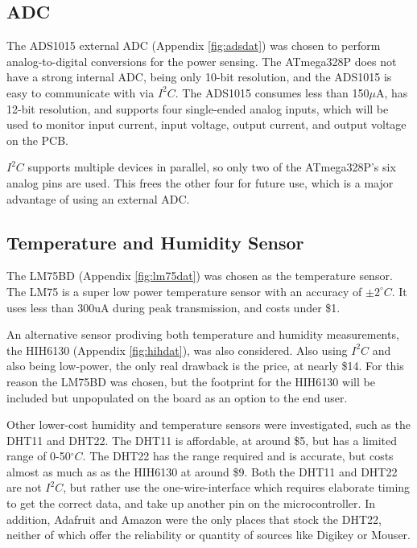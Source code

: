 \documentclass{article}
\numberwithin{figure}{section}
\numberwithin{equation}{section}
\begin{document}
{\subsection{ADC} \label{sect:adc_just}
The ADS1015 external ADC (Appendix \ref{fig:adsdat}) was chosen to perform analog-to-digital conversions for the power sensing. The ATmega328P does not have a strong internal ADC, being only 10-bit resolution, and the ADS1015 is easy to communicate with via $I^2 C$. The ADS1015 consumes less than 150$\mu$A, has 12-bit resolution, and supports four single-ended analog inputs, which will be used to monitor input current, input voltage, output current, and output voltage on the PCB.

\bigskip
$I^2 C$ supports multiple devices in parallel, so only two of the ATmega328P's six analog pins are used. This frees the other four for future use, which is a major advantage of using an external ADC.

\subsection{Temperature and Humidity Sensor} \label{sect:temp_just}
The LM75BD (Appendix \ref{fig:lm75dat}) was chosen as the temperature sensor.  The LM75 is a super low power temperature sensor with an accuracy of $\pm2^{\circ}C$. It uses less than 300uA during peak transmission, and costs under \$1.

\bigskip
An alternative sensor prodiving both temperature and humidity measurements, the HIH6130 (Appendix \ref{fig:hihdat}), was also considered. Also using $I^2 C$ and also being low-power, the only real drawback is the price, at nearly \$14. For this reason the LM75BD was chosen, but the footprint for the HIH6130 will be included but unpopulated on the board as an option to the end user.

\bigskip
Other lower-cost humidity and temperature sensors were investigated, such as the DHT11 and DHT22. The DHT11 is affordable, at around \$5, but has a limited range of 0-50$^{\circ}C$. The DHT22 has the range required and is accurate, but costs almost as much as as the HIH6130 at around \$9. Both the DHT11 and DHT22 are not $I^2 C$, but rather use the one-wire-interface which requires elaborate timing to get the correct data, and take up another pin on the microcontroller. In addition, Adafruit and Amazon were the only places that stock the DHT22, neither of which offer the reliability or quantity of sources like Digikey or Mouser.

}
\end{document}

